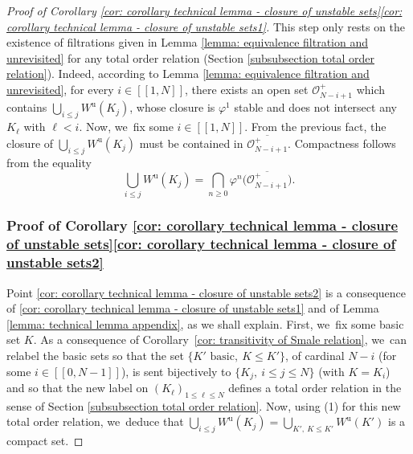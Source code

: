 \documentclass[11pt]{article}
\newcommand{\lcr}{[\![}
\newcommand{\rcr}{]\!]}
\newcommand{\ru}{\mathrm{u}}
\theoremstyle{definition}
\theoremstyle{plain}
\newcommand{\Ocal}{\mathcal{O}}
\begin{document}
\begin{appendix}
\begin{proof}[Proof of Corollary \ref{cor: corollary technical lemma - closure of unstable sets}\eqref{cor: corollary technical lemma - closure of unstable sets1}]
This step only rests on the existence of filtrations given in Lemma \ref{lemma: equivalence filtration and unrevisited} for any total order relation (Section \ref{subsubsection total order relation}). Indeed, according to Lemma \ref{lemma: equivalence filtration and unrevisited}, for every $i\in\lcr1,N\rcr$, there exists an open set $\Ocal_{N-i + 1}^+$ which contains $\bigcup_{i \leq j} W^\ru (K_j)$, whose closure is $\varphi^1$ stable and does not intersect any $K_\ell$ with $\ell < i$. Now, we~fix some $i\in\lcr1,N\rcr$. From the previous fact, the closure of $\bigcup_{i \leq j} W^\ru (K_j)$ must be contained in $\overline{\Ocal_{N-i + 1}^+}$. Compactness follows from the equality
\[
\bigcup_{i \leq j} W^\ru (K_j) = \bigcap_{n \geq 0} \varphi^n \bigl(\overline{\Ocal_{N-i+1}^+} \bigr).
\]

\subsubsection*{Proof of Corollary \ref{cor: corollary technical lemma - closure of unstable sets}\eqref{cor: corollary technical lemma - closure of unstable sets2}} Point \eqref{cor: corollary technical lemma - closure of unstable sets2} is a consequence of \eqref{cor: corollary technical lemma - closure of unstable sets1} and of Lemma \ref{lemma: technical lemma appendix}, as we shall explain. First, we~fix some basic set $K$. As a consequence of Corollary~\ref{cor: transitivity of Smale relation}, we~can relabel the basic sets so that the set $\{K' \text{ basic}, \: K \leq K' \}$, of cardinal $N-i$ (for some $i\in\lcr0,N-1\rcr$), is sent bijectively to $\{K_j,\: i \leq j \leq N\}$ (with $K = K_i$) and so that the new label on $(K_\ell)_{1 \leq \ell \leq N}$ defines a total order relation in the sense of Section \ref{subsubsection total order relation}. Now, using (1) for this new total order relation, we~deduce that $\bigcup_{i \leq j} W^\ru (K_j) = \bigcup_{K', \: K \leq K'} W^\ru (K')$ is a compact set.


\end{proof}
\end{appendix}
\end{document}
